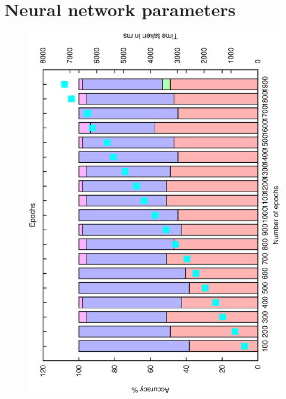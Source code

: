 \documentclass[12pt,a4,notitlepage]{report}
\renewcommand{\_}{\texttt{\symbol{95}}}
\newcommand{\<}{\texttt{\symbol{60}}}
\renewcommand{\>}{\texttt{\symbol{62}}}
\begin{document}
\section{Neural network parameters}

\begin{figure}
\centering
\includegraphics[scale=0.3,angle=-90]{results/neural/n_epochs.ps}

\end{figure}
\end{document}
